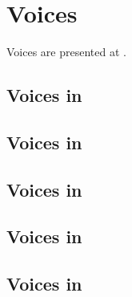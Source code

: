 



\chapter{Voices}\label{Voices}

Voices are presented at .


\section{Voices in \mxsrToMsr{}}


\section{Voices in \mxsrToMsr{}}


\section{Voices in \msrToMsr{}}


\section{Voices in \msrToLpsr{}}


\section{Voices in \lpsrToLilypond{}}


